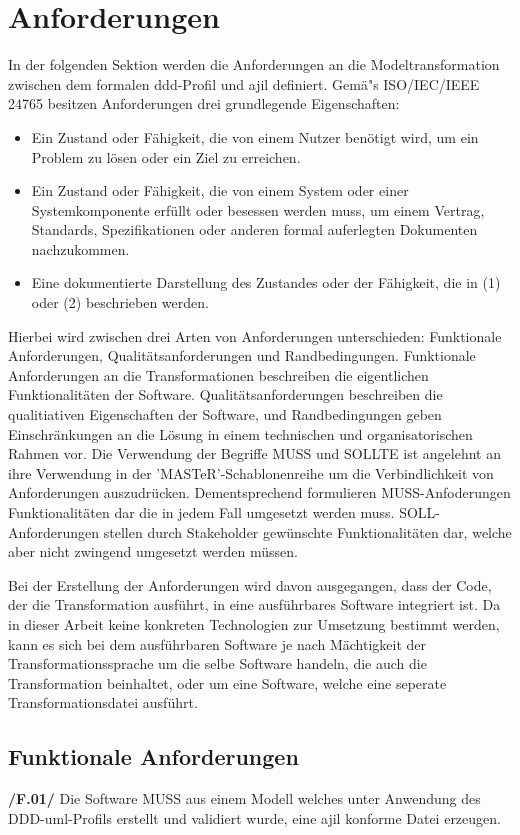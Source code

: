 \documentclass[
	oneside,  %
	ngerman, 
	final, 
	11pt, 
	a4paper, 
	1.1headlines, 
	headinclude=false, 
	footinclude=false, 
	mpinclude=false, 
	pagesize, 
	onecolumn, 
	titlepage, 
	parskip=half, 
	headsepline, 
	chapterprefix=false, 
	version=first, 
	listof=totoc, 
	bibliography=totoc, 
	toc=graduated, 
	fleqn
]{scrbook}
\begin{document}
\section{Anforderungen}
In der folgenden Sektion werden die Anforderungen an die Modeltransformation zwischen dem formalen \ac{ddd}-Profil und \ac{ajil} definiert. Gemä"s ISO/IEC/IEEE 24765 \cite{IEEE10} besitzen Anforderungen drei grundlegende Eigenschaften: 
\begin{itemize}
\item Ein Zustand oder Fähigkeit, die von einem Nutzer benötigt wird, um ein Problem zu lösen oder ein Ziel zu erreichen.
\item Ein Zustand oder Fähigkeit, die von einem System oder einer Systemkomponente  erfüllt oder besessen werden muss, um einem Vertrag, Standards, Spezifikationen oder anderen formal auferlegten Dokumenten nachzukommen.
\item Eine dokumentierte Darstellung des Zustandes oder der Fähigkeit, die in (1) oder (2) beschrieben werden. 
\end{itemize}
Hierbei wird zwischen drei Arten von Anforderungen unterschieden: Funktionale Anforderungen, Qualitätsanforderungen und Randbedingungen. Funktionale Anforderungen an die Transformationen beschreiben die eigentlichen Funktionalitäten der Software. Qualitätsanforderungen beschreiben die qualitiativen Eigenschaften der Software, und Randbedingungen geben Einschränkungen an die Lösung in einem technischen und organisatorischen Rahmen vor. \cite{requirementsGrundlagen} Die Verwendung der Begriffe MUSS und SOLLTE ist angelehnt an ihre Verwendung in der 'MASTeR'-Schablonenreihe um die Verbindlichkeit von Anforderungen auszudrücken. Dementsprechend formulieren MUSS-Anfoderungen Funktionalitäten dar die in jedem Fall umgesetzt werden muss. SOLL-Anforderungen stellen durch Stakeholder gewünschte Funktionalitäten dar, welche aber nicht zwingend umgesetzt werden müssen. \cite{schablonen}

Bei der Erstellung der Anforderungen wird davon ausgegangen, dass der Code, der die Transformation ausführt, in eine ausführbares Software integriert ist. Da in dieser Arbeit keine konkreten Technologien zur Umsetzung bestimmt werden, kann es sich bei dem ausführbaren Software je nach Mächtigkeit der Transformationssprache um die selbe Software handeln, die auch die Transformation beinhaltet, oder um eine Software, welche eine seperate Transformationsdatei ausführt.

\subsection{Funktionale Anforderungen}
\textbf{/F.01/} Die Software MUSS aus einem Modell welches unter Anwendung des \ac{DDD}-\ac{uml}-Profils erstellt und validiert wurde, eine \ac{ajil} konforme Datei erzeugen.
\end{document}

